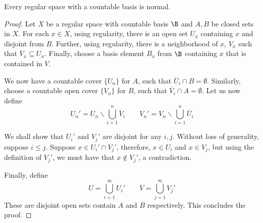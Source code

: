 \begin{theorem}
    Every regular space with a countable basis is normal.
\end{theorem}
\begin{proof}
    Let $X$ be a regular space with countable basis $\B$ and $A,B$ be closed sets in $X$. For each $x\in X$, using regularity, there is an open set $U_x$ containing $x$ and disjoint from $B$. Further, using regularity, there is a neighborhood of $x$, $V_x$ such that $\overline{V}_x\subseteq U_x$. Finally, choose a basis element $B_x$ from $\B$ containing $x$ that is contained in $V$.

    We now have a countable cover $\{U_n\}$ for $A$, such that $\overline{U}_i\cap B = \emptyset$. Similarly, choose a countable open cover $\{V_n\}$ for $B$, such that $\overline{V}_i\cap A = \emptyset$. Let us now define 
    \begin{equation*}
        U_n' = U_n\backslash\bigcup_{i = 1}^n\overline{V}_i 
        \qquad 
        V_n' = V_n\backslash\bigcup_{i = 1}^n\overline{U}_i 
    \end{equation*}

    We shall show that $U_i'$ and $V_j'$ are disjoint for any $i,j$. Without loss of generality, suppose $i\le j$. Suppose $x\in U_i'\cap V_j'$, therefore, $x\in U_i$ and $x\in V_j$, but using the definition of $V_j'$, we must have that $x\notin V_j'$, a contradiction.

    Finally, define 
    \begin{equation*}
        U = \bigcup_{i = 1}^\infty U_i'\qquad V = \bigcup_{j = 1}^\infty V_j'
    \end{equation*}
    These are disjoint open sets contain $A$ and $B$ respectively. This concludes the proof.
\end{proof}

